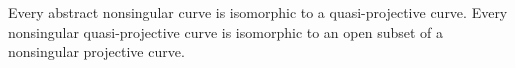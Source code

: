 Every abstract nonsingular curve is isomorphic to a quasi-projective curve. Every nonsingular quasi-projective curve is isomorphic to an open subset of a nonsingular projective curve.
